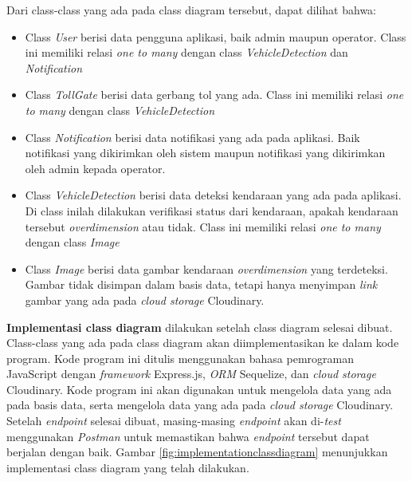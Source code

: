 Dari class-class yang ada pada class diagram tersebut, dapat dilihat bahwa:
\begin{itemize}[nolistsep]
  \item Class \emph{User} berisi data pengguna aplikasi, baik admin maupun operator. Class ini memiliki relasi \emph{one to many} dengan class \emph{VehicleDetection} dan \emph{Notification}
  \item Class \emph{TollGate} berisi data gerbang tol yang ada. Class ini memiliki relasi \emph{one to many} dengan class \emph{VehicleDetection}
  \item Class \emph{Notification} berisi data notifikasi yang ada pada aplikasi. Baik notifikasi yang dikirimkan oleh sistem maupun notifikasi yang dikirimkan oleh admin kepada operator.
  \item Class \emph{VehicleDetection} berisi data deteksi kendaraan yang ada pada aplikasi. Di class inilah dilakukan verifikasi status dari kendaraan, apakah kendaraan tersebut \emph{overdimension} atau tidak. Class ini memiliki relasi \emph{one to many} dengan class \emph{Image}
  \item Class \emph{Image} berisi data gambar kendaraan \emph{overdimension} yang terdeteksi. Gambar tidak disimpan dalam basis data, tetapi hanya menyimpan \emph{link} gambar yang ada pada \emph{cloud storage} Cloudinary.
\end{itemize}

\textbf{Implementasi class diagram} dilakukan setelah class diagram selesai dibuat. Class-class yang ada pada class diagram akan diimplementasikan ke dalam kode program. Kode program ini ditulis menggunakan bahasa pemrograman JavaScript dengan \emph{framework} Express.js, \emph{ORM} Sequelize, dan \emph{cloud storage} Cloudinary. Kode program ini akan digunakan untuk mengelola data yang ada pada basis data, serta mengelola data yang ada pada \emph{cloud storage} Cloudinary. Setelah \emph{endpoint} selesai dibuat, masing-masing \emph{endpoint} akan di-\emph{test} menggunakan \emph{Postman} untuk memastikan bahwa \emph{endpoint} tersebut dapat berjalan dengan baik. Gambar \ref{fig:implementationclassdiagram} menunjukkan implementasi class diagram yang telah dilakukan.

